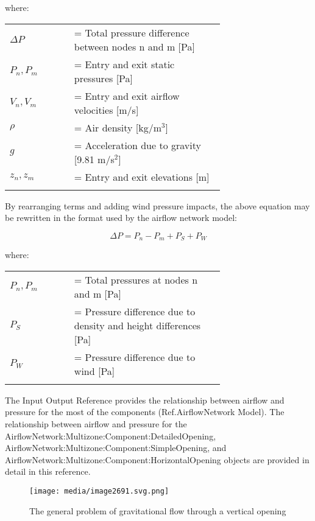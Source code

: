 where:

\begin{tabular}{lp{0.7\linewidth}}
\\
$\Delta P$ &= Total pressure difference between nodes n and m [Pa] \\
$P_n, P_m$ &= Entry and exit static pressures [Pa] \\
$V_n, V_m$ &= Entry and exit airflow velocities [m/s] \\
$\rho$ &= Air density [kg/m\(^{3}\)] \\
$g$ &= Acceleration due to gravity [9.81 m/s\(^{2}\)] \\
$z_n, z_m$ &= Entry and exit elevations [m] \\
\\
\end{tabular}


By rearranging terms and adding wind pressure impacts, the above equation may be rewritten in the format used by the airflow network model:

\begin{equation}
\Delta P = {P_n} - {P_m} + {P_S} + {P_W}
\end{equation}

where:

\begin{tabular}{lp{0.7\linewidth}}
\\
$P_n, P_m$ &= Total pressures at nodes n and m [Pa] \\
$P_S$ &= Pressure difference due to density and height differences [Pa] \\
$P_W$ &= Pressure difference due to wind [Pa] \\
\\
\end{tabular}

The Input Output Reference provides the relationship between airflow and pressure for the most of the components (Ref.AirflowNetwork Model). The relationship between airflow and pressure for the AirflowNetwork:Multizone:Component:DetailedOpening, AirflowNetwork:Multizone:Component:SimpleOpening, and Air\-flow\-Net\-work:\-Multi\-zone:\-Com\-ponent:\-Horizontal\-Opening objects are provided in detail in this reference.

\begin{figure}[hbtp] %
\centering
\texttt{[image: media/image2691.svg.png]}
\caption{The general problem of gravitational flow through a vertical opening \protect \label{fig:the-general-problem-of-gravitational-flow}}
\end{figure}

